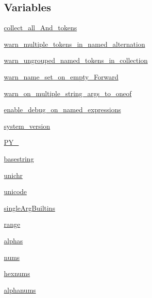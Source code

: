 \subsection*{Variables}
\begin{DoxyCompactItemize}
\item 
\hyperlink{namespacepyparsing_a36ef0f31029c711e127c908399dd04bb}{collect\+\_\+all\+\_\+\+And\+\_\+tokens}
\item 
\hyperlink{namespacepyparsing_a7d99f94ef00c20cbfc7c636536123ad3}{warn\+\_\+multiple\+\_\+tokens\+\_\+in\+\_\+named\+\_\+alternation}
\item 
\hyperlink{namespacepyparsing_a2613eebe20756859399b13cd478b2f22}{warn\+\_\+ungrouped\+\_\+named\+\_\+tokens\+\_\+in\+\_\+collection}
\item 
\hyperlink{namespacepyparsing_abd7b3ceae5de7e98982573176ca2ffa1}{warn\+\_\+name\+\_\+set\+\_\+on\+\_\+empty\+\_\+\+Forward}
\item 
\hyperlink{namespacepyparsing_a54dcb097557af387ec19dc45be5b0f28}{warn\+\_\+on\+\_\+multiple\+\_\+string\+\_\+args\+\_\+to\+\_\+oneof}
\item 
\hyperlink{namespacepyparsing_a5dd424478354cea2c2a4eec9e762fd23}{enable\+\_\+debug\+\_\+on\+\_\+named\+\_\+expressions}
\item 
\hyperlink{namespacepyparsing_a07e6a30780a15263d8cb84c17a229a69}{system\+\_\+version}
\item 
\hyperlink{namespacepyparsing_a1e1385063b54a6e3461c11bb1c85c72f}{P\+Y\+\_}
\item 
\hyperlink{namespacepyparsing_a6c68e6b7f8abb69c2e4bf97f737501e4}{basestring}
\item 
\hyperlink{namespacepyparsing_a6fb3beeb55235aeb9620d7c12b47dab4}{unichr}
\item 
\hyperlink{namespacepyparsing_a26795664953d67ad5c7ed1828e11aa6b}{unicode}
\item 
\hyperlink{namespacepyparsing_a1784680ba17a7229153f90c437d5fe39}{single\+Arg\+Builtins}
\item 
\hyperlink{namespacepyparsing_a602ae0487c529c04f859bb13c0d8a50f}{range}
\item 
\hyperlink{namespacepyparsing_a7ea525fb202cede10838006336a1bce3}{alphas}
\item 
\hyperlink{namespacepyparsing_a5a54a159f2739470343562de3a9079a7}{nums}
\item 
\hyperlink{namespacepyparsing_acb57794a1fe02811f6033bb6f89f3ccb}{hexnums}
\item 
\hyperlink{namespacepyparsing_ab4563dfe6c41c6e5f5ac641f3264882a}{alphanums}

\end{DoxyCompactItemize}
